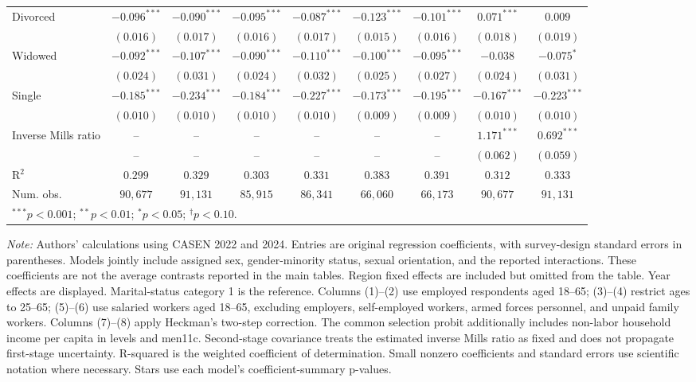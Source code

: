 \begin{table}[htpb]
{\begin{tabular}{l c c c c c c c c}
Divorced & $-0.096^{***}$ & $-0.090^{***}$ & $-0.095^{***}$ & $-0.087^{***}$ & $-0.123^{***}$ & $-0.101^{***}$ & $0.071^{***}$ & $0.009$ \\
 & $(0.016)$ & $(0.017)$ & $(0.016)$ & $(0.017)$ & $(0.015)$ & $(0.016)$ & $(0.018)$ & $(0.019)$ \\
Widowed & $-0.092^{***}$ & $-0.107^{***}$ & $-0.090^{***}$ & $-0.110^{***}$ & $-0.100^{***}$ & $-0.095^{***}$ & $-0.038$ & $-0.075^{*}$ \\
 & $(0.024)$ & $(0.031)$ & $(0.024)$ & $(0.032)$ & $(0.025)$ & $(0.027)$ & $(0.024)$ & $(0.031)$ \\
Single & $-0.185^{***}$ & $-0.234^{***}$ & $-0.184^{***}$ & $-0.227^{***}$ & $-0.173^{***}$ & $-0.195^{***}$ & $-0.167^{***}$ & $-0.223^{***}$ \\
 & $(0.010)$ & $(0.010)$ & $(0.010)$ & $(0.010)$ & $(0.009)$ & $(0.009)$ & $(0.010)$ & $(0.010)$ \\
Inverse Mills ratio & -- & -- & -- & -- & -- & -- & $1.171^{***}$ & $0.692^{***}$ \\
 & -- & -- & -- & -- & -- & -- & $(0.062)$ & $(0.059)$ \\
\hline
R$^2$ & $0.299$ & $0.329$ & $0.303$ & $0.331$ & $0.383$ & $0.391$ & $0.312$ & $0.333$ \\
Num. obs. & $90,677$ & $91,131$ & $85,915$ & $86,341$ & $66,060$ & $66,173$ & $90,677$ & $91,131$ \\
\hline
\multicolumn{9}{l}{\scriptsize $^{***}p<0.001$; $^{**}p<0.01$; $^{*}p<0.05$; $^{\dagger}p<0.10$.} \\
\end{tabular}%
}
\par\smallskip
\begin{minipage}{\textwidth}\footnotesize\raggedright
\textit{Note:} Authors' calculations using CASEN 2022 and 2024. Entries are original regression coefficients, with survey-design standard errors in parentheses. Models jointly include assigned sex, gender-minority status, sexual orientation, and the reported interactions. These coefficients are not the average contrasts reported in the main tables. Region fixed effects are included but omitted from the table. Year effects are displayed. Marital-status category 1 is the reference. Columns (1)--(2) use employed respondents aged 18--65; (3)--(4) restrict ages to 25--65; (5)--(6) use salaried workers aged 18--65, excluding employers, self-employed workers, armed forces personnel, and unpaid family workers. Columns (7)--(8) apply Heckman's two-step correction. The common selection probit additionally includes non-labor household income per capita in levels and men11c. Second-stage covariance treats the estimated inverse Mills ratio as fixed and does not propagate first-stage uncertainty. R-squared is the weighted coefficient of determination. Small nonzero coefficients and standard errors use scientific notation where necessary. Stars use each model's coefficient-summary p-values.
\end{minipage}
\end{table}
